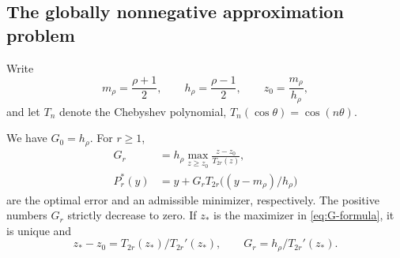 \subsection{The globally nonnegative approximation problem}
Write
\[
 m_\rho=\frac{\rho+1}{2},\qquad h_\rho=\frac{\rho-1}{2},\qquad
 z_0=\frac{m_\rho}{h_\rho},
\]
and let $T_n$ denote the Chebyshev polynomial, $T_n(\cos\theta)=\cos(n\theta)$.
\begin{theorem}\label{thm:thresholds}
We have $G_0=h_\rho$. For $r\geq1$,
\begin{align}
 G_r&=h_\rho\max_{z\geq z_0}\frac{z-z_0}{T_{2r}(z)},\label{eq:G-formula}\\
 P_r^*(y)&=y+G_r T_{2r}\bigl((y-m_\rho)/h_\rho\bigr)\label{eq:extremizer}
\end{align}
are the optimal error and an admissible minimizer, respectively. The positive numbers $G_r$ strictly decrease to zero. If $z_*$ is the maximizer in \eqref{eq:G-formula}, it is unique and
\begin{equation}\label{eq:G-stationary}
 z_*-z_0=T_{2r}(z_*)/T_{2r}'(z_*),\qquad
 G_r=h_\rho/T_{2r}'(z_*).
\end{equation}
\end{theorem}
